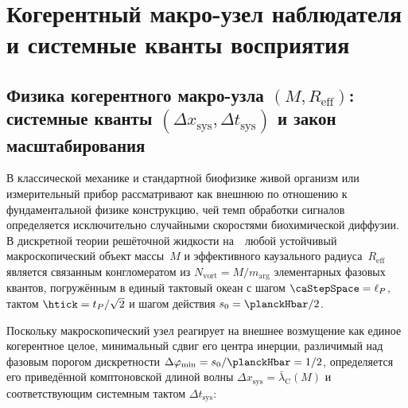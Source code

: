 \part{Когерентный макро-узел наблюдателя и системные кванты восприятия}

\chapter{Физика когерентного макро-узла \texorpdfstring{$(M, R_{\mathrm{eff}})$}{(M, R\_eff)}: системные кванты \texorpdfstring{$(\Delta x_{\mathrm{sys}}, \Delta t_{\mathrm{sys}})$}{(dx, dt)} и закон масштабирования}
\label{ch:observer-system-quanta}

В классической механике и стандартной биофизике живой организм или измерительный прибор рассматривают как внешнюю по отношению к фундаментальной физике конструкцию, чей темп обработки сигналов определяется исключительно случайными скоростями биохимической диффузии.
В дискретной теории решёточной жидкости на~\latGCK\ любой устойчивый макроскопический объект массы~$M$ и эффективного каузального радиуса~$R_{\mathrm{eff}}$ является связанным конгломератом из $N_{\mathrm{vort}} = M / m_{\mathrm{arg}}$ элементарных фазовых квантов, погружённым в единый тактовый океан с шагом $\caStepSpace = \ell_P$, тактом $\htick = t_P/\sqrt{2}$ и шагом действия $s_0 = \planckHbar/2$.

Поскольку макроскопический узел реагирует на внешнее возмущение как единое когерентное целое, минимальный сдвиг его центра инерции, различимый над фазовым порогом дискретности $\Delta\varphi_{\min} = s_0/\planckHbar = 1/2$, определяется его приведённой комптоновской длиной волны $\Delta x_{\mathrm{sys}} = \bar\lambda_{\mathrm{C}}(M)$ и соответствующим системным тактом $\Delta t_{\mathrm{sys}}$:

